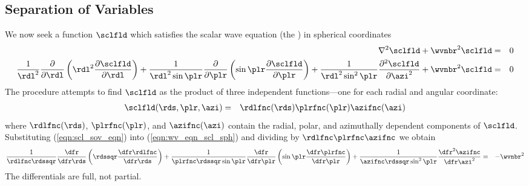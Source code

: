 \documentclass[12pt]{article}
\begin{document}
\subsection[Separation of Variables]{Separation of Variables}\label{sxn:SOV}
We now seek a function $\sclfld$ which satisfies the scalar wave
equation (the ) in spherical coordinates 
\begin{eqnarray}
\nabla^{2} \sclfld + \wvnbr^{2} \sclfld & = & 0 \\
\frac{1}{\rdl^{2}} \frac{\partial}{\partial \rdl} 
\left( \rdl^{2} \frac{\partial \sclfld}{\partial \rdl} \right) +
\frac{1}{\rdl^{2} \sin \plr} \frac{\partial}{\partial \plr}
\left( \sin \plr \frac{\partial \sclfld}{\partial \plr} \right) + 
\frac{1}{\rdl^{2} \sin^{2} \plr} \frac{\partial^{2} \sclfld}{\partial \azi^{2}}
+ \wvnbr^{2} \sclfld & = & 0
\label{eqn:wv_eqn_scl_sph}
\end{eqnarray}
The  procedure attempts to find
$\sclfld$ as the product of three independent functions---one for each
radial and angular coordinate: 
\begin{eqnarray}
\sclfld( \rds, \plr, \azi) & = & \rdlfnc (\rds) \plrfnc (\plr) \azifnc (\azi)
\label{eqn:scl_sov_eqn}
\end{eqnarray}
where $\rdlfnc(\rds)$, $\plrfnc(\plr)$, and $\azifnc(\azi)$ contain
the radial, polar, and azimuthally dependent components of $\sclfld$. 
Substituting (\ref{eqn:scl_sov_eqn}) into (\ref{eqn:wv_eqn_scl_sph})
and dividing by $\rdlfnc\plrfnc\azifnc$ we obtain
\cite[][p.~115]{Arf85} 
\begin{eqnarray}
\frac{1}{\rdlfnc\rdssqr} \frac{\dfr}{\dfr\rds} 
\left( \rdssqr \frac{\dfr\rdlfnc}{\dfr\rds} \right) +
\frac{1}{\plrfnc\rdssqr\sin\plr} \frac{\dfr}{\dfr\plr}
\left( \sin\plr \frac{\dfr\plrfnc}{\dfr\plr} \right) +
\frac{1}{\azifnc\rdssqr\sin^{2}\plr} \frac{\dfr^{2}\azifnc}{\dfr\azi^{2}}
& = & -\wvnbr^{2}
\label{eqn:wvn_eqn_sph_sov}
\end{eqnarray}
The differentials are full, not partial.
\end{document}
